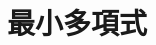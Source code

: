 \documentclass[../../../topic_linear-algebra]{subfiles}
\begin{document}
\sectionline
\section{最小多項式}

\todo{}
\end{document}
